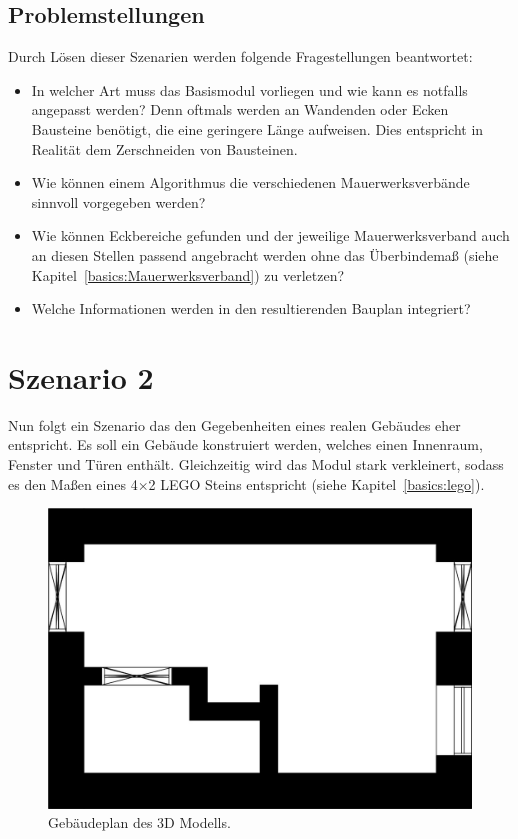 \subsection*{Problemstellungen}
Durch Lösen dieser Szenarien werden folgende Fragestellungen beantwortet:
\begin{itemize}
  \item In welcher Art muss das Basismodul vorliegen und wie kann es notfalls angepasst werden? 
  Denn oftmals werden an Wandenden oder Ecken Bausteine benötigt, die eine geringere Länge aufweisen.
  Dies entspricht in Realität dem Zerschneiden von Bausteinen.
  \item Wie können einem Algorithmus die verschiedenen Mauerwerksverbände sinnvoll vorgegeben werden?
  \item Wie können Eckbereiche gefunden und der jeweilige Mauerwerksverband auch an diesen Stellen passend angebracht werden ohne das Überbindemaß (siehe Kapitel~\ref{basics:Mauerwerksverband}) zu verletzen?
  \item Welche Informationen werden in den resultierenden Bauplan integriert?
\end{itemize}

\section{Szenario 2}\label{scenarios:scenario2}
Nun folgt ein Szenario das den Gegebenheiten eines realen Gebäudes eher entspricht.
Es soll ein Gebäude konstruiert werden, welches einen Innenraum, Fenster und Türen enthält.
Gleichzeitig wird das Modul stark verkleinert, sodass es den Maßen eines 4$\times$2 LEGO Steins entspricht (siehe Kapitel~\ref{basics:lego}).

\begin{figure}[ht]
  \centering
  \includegraphics[width=0.505\columnwidth]{fig/scenario1_story_plan.jpg}
  \caption{Gebäudeplan des 3D Modells.}
  \label{fig:scenarios:Scenario1 Gebaeudeplan}
\end{figure}

